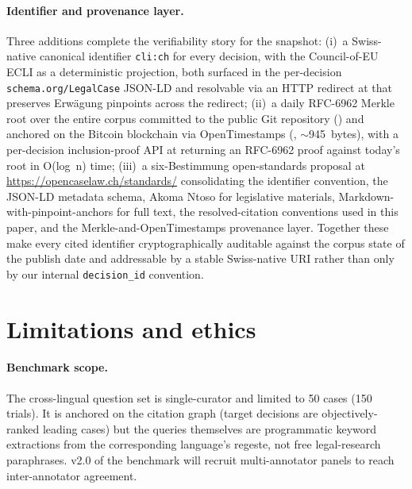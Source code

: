 \documentclass[11pt,a4paper]{article}
\begin{document}
\paragraph{Identifier and provenance layer.} Three additions complete the verifiability story for the snapshot: (i)~a Swiss-native canonical identifier \texttt{cli:ch} for every decision, with the Council-of-EU ECLI as a deterministic projection, both surfaced in the per-decision \texttt{schema.org/LegalCase} JSON-LD and resolvable via an HTTP redirect at  that preserves Erwägung pinpoints across the redirect; (ii)~a daily RFC-6962 Merkle root over the entire corpus committed to the public Git repository () and anchored on the Bitcoin blockchain via OpenTimestamps (, $\sim$945~bytes), with a per-decision inclusion-proof API at  returning an RFC-6962 proof against today's root in O(log~n) time; (iii)~a six-Bestimmung open-standards proposal at \url{https://opencaselaw.ch/standards/} consolidating the identifier convention, the JSON-LD metadata schema, Akoma Ntoso for legislative materials, Markdown-with-pinpoint-anchors for full text, the resolved-citation conventions used in this paper, and the Merkle-and-OpenTimestamps provenance layer. Together these make every cited identifier cryptographically auditable against the corpus state of the publish date and addressable by a stable Swiss-native URI rather than only by our internal \texttt{decision\_id} convention.

\section{Limitations and ethics}\label{sec:limit}

\paragraph{Benchmark scope.} The cross-lingual question set is single-curator and limited to 50 cases (150 trials). It is anchored on the citation graph (target decisions are objectively-ranked leading cases) but the queries themselves are programmatic keyword extractions from the corresponding language's regeste, not free legal-research paraphrases. v2.0 of the benchmark will recruit multi-annotator panels to reach inter-annotator agreement.
\end{document}
